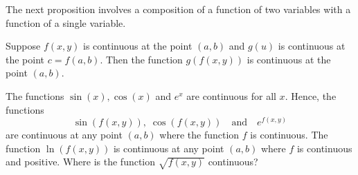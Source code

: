 \documentclass[handout]{ximera}
\begin{document}
The next proposition involves a composition of a function of two variables with a function of a single variable.

\begin{proposition}
Suppose $f(x,y)$ is continuous at the point $(a,b)$ and $g(u)$ is continuous at the point $ c = f(a,b)$.
Then the function $g(f(x,y))$ is continuous at the point $(a,b)$.
\end{proposition}

The functions $\sin(x), \cos(x)$ and $e^x$ are continuous for all $x$.  Hence, the functions
\[
\sin(f(x,y)),\; \cos(f(x,y)) \quad \text{and} \quad e^{f(x,y)}
\]
are continuous at any point $(a,b)$ where the function $f$ is continuous. 
The function $\ln(f(x,y))$ is continuous at any point $(a,b)$ where $f$ is continuous and positive.
Where is the function $\sqrt{f(x,y)}$ continuous?
\end{document}
